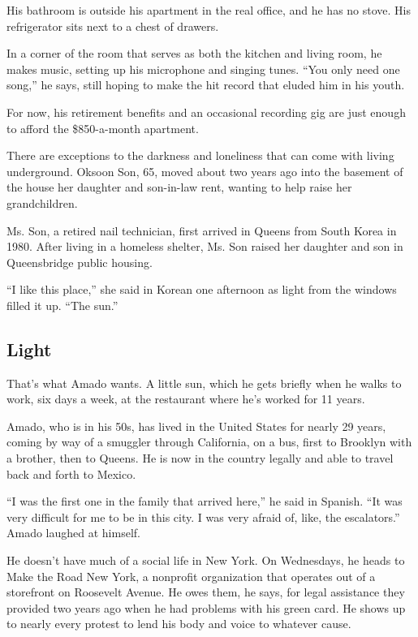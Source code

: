 His bathroom is outside his apartment in the real office, and he has no
stove. His refrigerator sits next to a chest of drawers.

In a corner of the room that serves as both the kitchen and living room,
he makes music, setting up his microphone and singing tunes. ``You only
need one song,'' he says, still hoping to make the hit record that
eluded him in his youth.

For now, his retirement benefits and an occasional recording gig are
just enough to afford the \$850-a-month apartment.

There are exceptions to the darkness and loneliness that can come with
living underground. Oksoon Son, 65, moved about two years ago into the
basement of the house her daughter and son-in-law rent, wanting to help
raise her grandchildren.

Ms. Son, a retired nail technician, first arrived in Queens from South
Korea in 1980. After living in a homeless shelter, Ms. Son raised her
daughter and son in Queensbridge public housing.

``I like this place,'' she said in Korean one afternoon as light from
the windows filled it up. ``The sun.''

\hypertarget{light}{%
\subsection{Light}\label{light}}

That's what Amado wants. A little sun, which he gets briefly when he
walks to work, six days a week, at the restaurant where he's worked for
11 years.

Amado, who is in his 50s, has lived in the United States for nearly 29
years, coming by way of a smuggler through California, on a bus, first
to Brooklyn with a brother, then to Queens. He is now in the country
legally and able to travel back and forth to Mexico.

``I was the first one in the family that arrived here,'' he said in
Spanish. ``It was very difficult for me to be in this city. I was very
afraid of, like, the escalators.'' Amado laughed at himself.

He doesn't have much of a social life in New York. On Wednesdays, he
heads to Make the Road New York, a nonprofit organization that operates
out of a storefront on Roosevelt Avenue. He owes them, he says, for
legal assistance they provided two years ago when he had problems with
his green card. He shows up to nearly every protest to lend his body and
voice to whatever cause.

